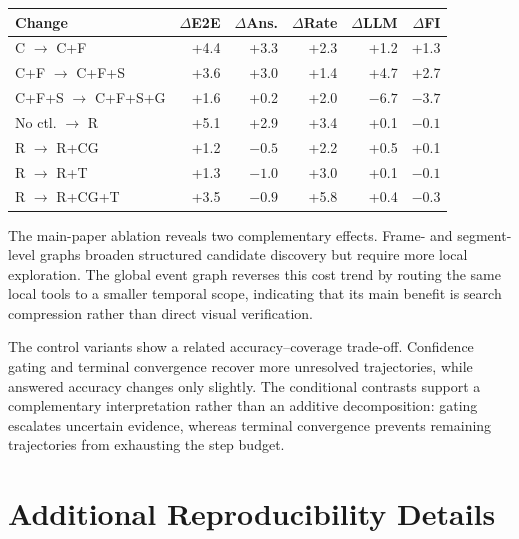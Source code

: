 \documentclass[11pt]{article}
\begin{document}
\begin{center}
  \centering
  \small
  \setlength{\tabcolsep}{1.9pt}
  \begin{tabular}{@{}lrrrrr@{}}
    \toprule
    \textbf{Change} &
    \textbf{$\Delta$E2E} &
    \textbf{$\Delta$Ans.} &
    \textbf{$\Delta$Rate} &
    \textbf{$\Delta$LLM} &
    \textbf{$\Delta$FI} \\
    \midrule
    C $\rightarrow$ C+F                 & +4.4 & +3.3 & +2.3 & +1.2 & +1.3 \\
    C+F $\rightarrow$ C+F+S             & +3.6 & +3.0 & +1.4 & +4.7 & +2.7 \\
    C+F+S $\rightarrow$ C+F+S+G          & +1.6 & +0.2 & +2.0 & $-6.7$ & $-3.7$ \\
    \midrule
    No ctl. $\rightarrow$ R              & +5.1 & +2.9 & +3.4 & +0.1 & $-0.1$ \\
    R $\rightarrow$ R+CG                & +1.2 & $-0.5$ & +2.2 & +0.5 & +0.1 \\
    R $\rightarrow$ R+T                 & +1.3 & $-1.0$ & +3.0 & +0.1 & $-0.1$ \\
    R $\rightarrow$ R+CG+T              & +3.5 & $-0.9$ & +5.8 & +0.4 & $-0.3$ \\
    \bottomrule
  \end{tabular}
  \label{tab:supp-deltas}
\end{center}

The main-paper ablation reveals two complementary effects.
Frame- and segment-level graphs broaden structured candidate discovery but require more local exploration.
The global event graph reverses this cost trend by routing the same local tools to a smaller temporal scope, indicating that its main benefit is search compression rather than direct visual verification.

The control variants show a related accuracy--coverage trade-off.
Confidence gating and terminal convergence recover more unresolved trajectories, while answered accuracy changes only slightly.
The conditional contrasts support a complementary interpretation rather than an additive decomposition: gating escalates uncertain evidence, whereas terminal convergence prevents remaining trajectories from exhausting the step budget.

\section{Additional Reproducibility Details}
\label{sec:supp-reproducibility}
\end{document}
